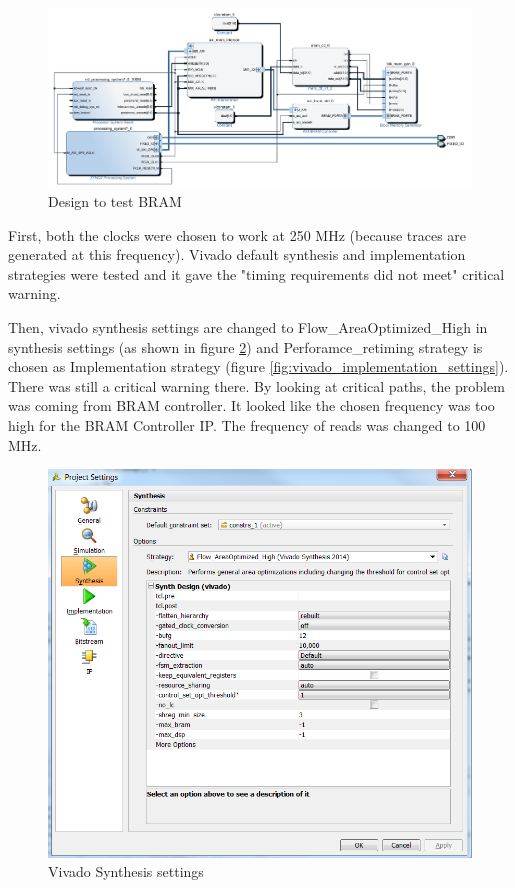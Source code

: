 \documentclass[10pt,a4paper, oneside]{memoir}
\begin{document}
\begin{figure}
\centering
\includegraphics[scale=.6, keepaspectratio]{images/test_design_mem_ctl_bram}
\caption{Design to test BRAM}
\label{fig:test_design_mem_ctl}
\end{figure}


First, both the clocks were chosen to work at 250 MHz (because traces are generated at this frequency). Vivado default synthesis and implementation strategies were tested and it gave the "timing requirements did not meet" critical warning. 

Then, vivado synthesis settings are changed to Flow\_AreaOptimized\_High in synthesis settings (as shown in figure \ref{fig:vivado_synthesis_settings}) and Perforamce\_retiming strategy is chosen as Implementation strategy (figure \ref{fig:vivado_implementation_settings}). There was still a critical warning there. By looking at critical paths, the problem was coming from BRAM controller. It looked like the chosen frequency was too high for the BRAM Controller IP. The frequency of reads was changed to 100 MHz.

\begin{figure}
\centering
\includegraphics[scale=.4, keepaspectratio]{images/synthesis_settings_vivado}
\caption{Vivado Synthesis settings}
\label{fig:vivado_synthesis_settings}
\end{figure}
\end{document}
